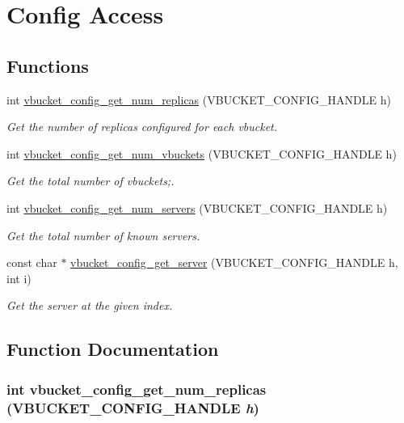 \hypertarget{group__cfg}{
\section{Config Access}
\label{group__cfg}
}
\subsection*{Functions}
\begin{DoxyCompactItemize}
\item 
int \hyperlink{group__cfg_ga98b511861a9091e834ff16ab80578e87}{vbucket\_\-config\_\-get\_\-num\_\-replicas} (VBUCKET\_\-CONFIG\_\-HANDLE h)
\begin{DoxyCompactList}\small\item\em Get the number of replicas configured for each vbucket. \item\end{DoxyCompactList}\item 
int \hyperlink{group__cfg_ga83b3ce8468743627eec4a27677b04148}{vbucket\_\-config\_\-get\_\-num\_\-vbuckets} (VBUCKET\_\-CONFIG\_\-HANDLE h)
\begin{DoxyCompactList}\small\item\em Get the total number of vbuckets;. \item\end{DoxyCompactList}\item 
int \hyperlink{group__cfg_ga3ee2eda1aab2a6c36794cc5ea9a89984}{vbucket\_\-config\_\-get\_\-num\_\-servers} (VBUCKET\_\-CONFIG\_\-HANDLE h)
\begin{DoxyCompactList}\small\item\em Get the total number of known servers. \item\end{DoxyCompactList}\item 
const char $\ast$ \hyperlink{group__cfg_gac403d4b4b1dce07946c8b4c48e824199}{vbucket\_\-config\_\-get\_\-server} (VBUCKET\_\-CONFIG\_\-HANDLE h, int i)
\begin{DoxyCompactList}\small\item\em Get the server at the given index. \item\end{DoxyCompactList}\end{DoxyCompactItemize}


\subsection{Function Documentation}
\hypertarget{group__cfg_ga98b511861a9091e834ff16ab80578e87}{
\subsubsection[{vbucket\_\-config\_\-get\_\-num\_\-replicas}]{\setlength{\rightskip}{0pt plus 5cm}int vbucket\_\-config\_\-get\_\-num\_\-replicas (VBUCKET\_\-CONFIG\_\-HANDLE {\em h})}}
\label{group__cfg_ga98b511861a9091e834ff16ab80578e87}


